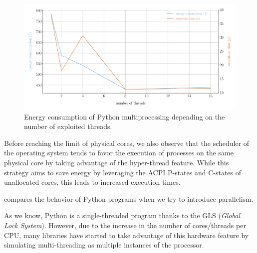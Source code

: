 \begin{figure}[hbt]
    \centering
    \includegraphics[width=\linewidth]{imgs/multiprocessing_energyvstime}
    \caption{Energy consumption of Python multiprocessing depending on the number of exploited threads.}
    \label{fig:python_multiprocessing}
\end{figure}


Before reaching the limit of physical cores, we also observe that the scheduler of the operating system tends to favor the execution of processes on the same physical core by taking advantage of the hyper-thread feature.
While this strategy aims to save energy by leveraging the ACPI P-states and C-states of unallocated cores, this leads to increased execution times.



 compares the behavior of Python programs when we try to introduce parallelism.

As we know, Python is a single-threaded program thanks to the GLS (\emph{Global Lock System}). However, due to the increase in the number of cores/threads per CPU, many libraries have started to take advantage of this hardware feature by simulating multi-threading as multiple instances of the processor.



